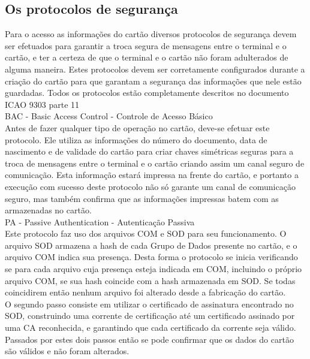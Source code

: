 \documentclass{article}
\begin{document}
\subsection{Os protocolos de segurança}
		\begin{justify}
			\hspace{2cm}Para o acesso as informações do cartão diversos protocolos de segurança devem ser efetuados para garantir a troca segura de mensagens entre o terminal e o cartão, e ter a certeza de que o terminal e o cartão não foram adulterados de alguma maneira. Estes protocolos devem ser corretamente configurados durante a criação do cartão para que garantam a segurança das informações que nele estão guardadas. Todos os protocolos estão completamente descritos no documento ICAO 9303 parte 11\\

			\hspace*{2cm} BAC - Basic Access Control - Controle de Acesso Básico\\
			\hspace*{2cm} Antes de fazer qualquer tipo de operação no cartão, deve-se efetuar este protocolo. Ele utiliza as informações do número do documento, data de nascimento e de validade do cartão para criar chaves simétricas seguras para a troca de mensagens entre o terminal e o cartão criando assim um canal seguro de comunicação. Esta informação estará impressa na frente do cartão, e portanto a execução com sucesso deste protocolo não só garante um canal de comunicação seguro, mas também confirma que as informações impressas batem com as armazenadas no cartão.\\
			
			\hspace*{2cm} PA - Passive Authentication - Autenticação Passiva\\
			\hspace*{2cm} Este protocolo faz uso dos arquivos COM e SOD para seu funcionamento. O arquivo SOD armazena a hash de cada Grupo de Dados presente no cartão, e o arquivo COM indica sua presença. Desta forma o protocolo se inicia verificando se para cada arquivo cuja presença esteja indicada em COM, incluindo o próprio arquivo COM, se sua hash coincide com a hash armazenada em SOD. Se todas coincidirem então nenhum arquivo foi alterado desde a fabricação do cartão.\\
			\hspace*{2cm} O segundo passo consiste em utilizar o certificado de assinatura encontrado no SOD, construindo uma corrente de certificação até um certificado assinado por uma CA reconhecida, e garantindo que cada certificado da corrente seja válido. Passados por estes dois passos então se pode confirmar que os dados do cartão são válidos e não foram alterados.\\
			

\end{justify}
\end{document}
